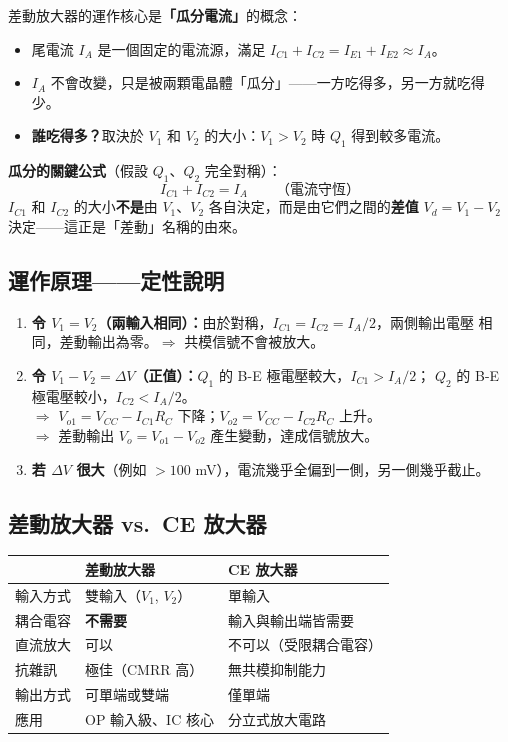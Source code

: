 \documentclass[12pt]{article}
\begin{document}
差動放大器的運作核心是\textbf{「瓜分電流」}的概念：
\begin{itemize}[leftmargin=2em]
  \item 尾電流 $I_A$ 是一個固定的電流源，滿足 $I_{C1} + I_{C2} = I_{E1} + I_{E2} \approx I_A$。
  \item $I_A$ 不會改變，只是被兩顆電晶體「瓜分」——一方吃得多，另一方就吃得少。
  \item \textbf{誰吃得多？}取決於 $V_1$ 和 $V_2$ 的大小：$V_1 > V_2$ 時 $Q_1$ 得到較多電流。
\end{itemize}

\begin{formulabox}
\textbf{瓜分的關鍵公式}（假設 $Q_1$、$Q_2$ 完全對稱）：
\[
  I_{C1} + I_{C2} = I_A \qquad\text{（電流守恆）}
\]
$I_{C1}$ 和 $I_{C2}$ 的大小\textbf{不是}由 $V_1$、$V_2$ 各自決定，而是由它們之間的\textbf{差值}
$V_d = V_1 - V_2$ 決定——這正是「差動」名稱的由來。
\end{formulabox}

\subsection*{運作原理——定性說明}

\begin{enumerate}[leftmargin=2em]
  \item \textbf{令 $V_1 = V_2$（兩輸入相同）：}由於對稱，$I_{C1} = I_{C2} = I_A/2$，兩側輸出電壓
        相同，差動輸出為零。$\Rightarrow$ 共模信號不會被放大。
  \item \textbf{令 $V_1 - V_2 = \Delta V$（正值）：}$Q_1$ 的 B-E 極電壓較大，$I_{C1} > I_A/2$；
        $Q_2$ 的 B-E 極電壓較小，$I_{C2} < I_A/2$。\\
        $\Rightarrow$ $V_{o1} = V_{CC} - I_{C1}R_C$ 下降；$V_{o2} = V_{CC} - I_{C2}R_C$ 上升。\\
        $\Rightarrow$ 差動輸出 $V_o = V_{o1} - V_{o2}$ 產生變動，達成信號放大。
  \item \textbf{若 $\Delta V$ 很大}（例如 $> 100$ mV），電流幾乎全偏到一側，另一側幾乎截止。
\end{enumerate}

\subsection*{差動放大器 vs.\ CE 放大器}

\begin{center}\small
\begin{tabular}{p{3.2cm}|p{5.0cm}|p{5.0cm}}
\toprule
 & \textbf{差動放大器} & \textbf{CE 放大器} \\
\midrule
輸入方式 & 雙輸入（$V_1$, $V_2$） & 單輸入 \\
耦合電容 & \textbf{不需要} & 輸入與輸出端皆需要 \\
直流放大 & 可以 & 不可以（受限耦合電容） \\
抗雜訊 & 極佳（CMRR 高） & 無共模抑制能力 \\
輸出方式 & 可單端或雙端 & 僅單端 \\
應用 & OP 輸入級、IC 核心 & 分立式放大電路 \\
\bottomrule
\end{tabular}
\end{center}
\end{document}
